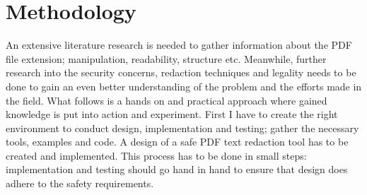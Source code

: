 \section{Methodology}
\label{sec:methodology}

An extensive literature research is needed to gather information about the PDF file extension; manipulation, readability, structure etc. Meanwhile, further research into the security concerns, redaction techniques and legality needs to be done to gain an even better understanding of the problem and the efforts made in the field. What follows is a hands on and practical approach where gained knowledge is put into action and experiment. First I have to create the right environment to conduct design, implementation and testing; gather the necessary tools, examples and code. A design of a safe PDF text redaction tool has to be created and implemented. This process has to be done in small steps: implementation and testing should go hand in hand to ensure that design does adhere to the safety requirements. 